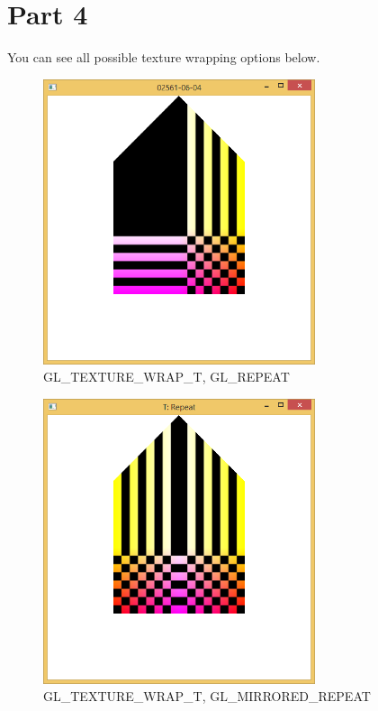 \section{Part 4}
\label{sec:del-4-1}

You can see all possible texture wrapping options below.

\begin{figure}[hp]
\centering
\includegraphics[width=8cm]{../Screenshots/ex-6/4-1.png}
\caption{GL\_TEXTURE\_WRAP\_T, GL\_REPEAT}
\label{fig:6-4-1}
\end{figure}

\begin{figure}[hp]
\centering
\includegraphics[width=8cm]{../Screenshots/ex-6/4-2.png}
\caption{GL\_TEXTURE\_WRAP\_T, GL\_MIRRORED\_REPEAT}
\label{fig:6-4-2}
\end{figure}

